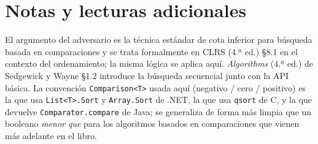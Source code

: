 \documentclass[11pt,a4paper]{article}
\begin{document}
\section{Notas y lecturas adicionales}

El argumento del adversario es la técnica estándar de cota inferior para búsqueda basada en comparaciones y se trata formalmente en CLRS (4.ª ed.) \S 8.1 en el contexto del ordenamiento; la misma lógica se aplica aquí. \emph{Algorithms} (4.ª ed.) de Sedgewick y Wayne \S 1.2 introduce la búsqueda secuencial junto con la API básica. La convención \texttt{Comparison<T>} usada aquí (negativo / cero / positivo) es la que usa \texttt{List<T>.Sort} y \texttt{Array.Sort} de .NET, la que usa \texttt{qsort} de C, y la que devuelve \texttt{Comparator.compare} de Java; se generaliza de forma más limpia que un booleano \emph{menor que} para los algoritmos basados en comparaciones que vienen más adelante en el libro.
\end{document}
